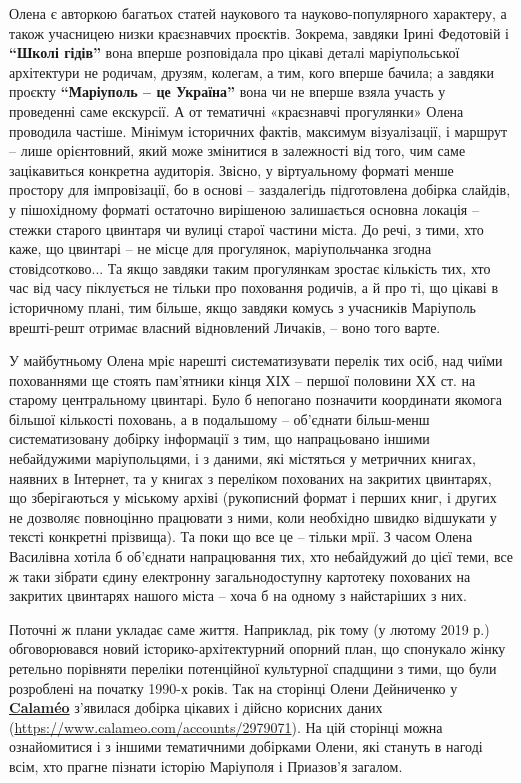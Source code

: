 
Олена є авторкою багатьох статей наукового та науково-популярного характеру, а
також учасницею низки краєзнавчих проєктів. Зокрема, завдяки Ірині Федотовій і
\textbf{\enquote{Школі гідів}} вона вперше розповідала про цікаві деталі маріупольської
архітектури не родичам, друзям, колегам, а тим, кого вперше бачила; а завдяки
проєкту \textbf{\enquote{Маріуполь – це Україна}} вона чи не вперше взяла участь у проведенні
саме екскурсії. А от тематичні «краєзнавчі прогулянки» Олена проводила частіше.
Мінімум історичних фактів, максимум візуалізації, і маршрут – лише орієнтовний,
який може змінитися в залежності від того, чим саме зацікавиться конкретна
аудиторія. Звісно, у віртуальному форматі менше простору для імпровізації, бо в
основі – заздалегідь підготовлена добірка слайдів, у пішохідному форматі
остаточно вирішеною залишається основна локація – стежки старого цвинтаря чи
вулиці старої частини міста. До речі, з тими, хто каже, що цвинтарі – не місце
для прогулянок, маріупольчанка згодна стовідсотково... Та якщо завдяки таким
прогулянкам зростає кількість тих, хто час від часу піклується не тільки про
поховання родичів, а й про ті, що цікаві в історичному плані, тим більше, якщо
завдяки комусь з учасників Маріуполь врешті-решт отримає власний відновлений
Личаків, – воно того варте.

У майбутньому Олена мріє нарешті систематизувати перелік тих осіб, над чиїми
похованнями ще стоять пам'ятники кінця ХІХ – першої половини ХХ ст. на старому
центральному цвинтарі. Було б непогано позначити координати якомога більшої
кількості поховань, а в подальшому – об'єднати більш-менш систематизовану
добірку інформації з тим, що напрацьовано іншими небайдужими маріупольцями, і з
даними, які містяться у метричних книгах, наявних в Інтернет, та у книгах з
переліком похованих на закритих цвинтарях, що зберігаються у міському архіві
(рукописний формат і перших книг, і других не дозволяє повноцінно працювати з
ними, коли необхідно швидко відшукати у тексті конкретні прізвища). Та поки що
все це – тільки мрії. З часом Олена Василівна хотіла б об'єднати напрацювання
тих, хто небайдужий до цієї теми, все ж таки зібрати єдину електронну
загальнодоступну картотеку похованих на закритих цвинтарях нашого міста – хоча
б на одному з найстаріших з них. 

Поточні ж плани укладає саме життя. Наприклад, рік тому (у лютому 2019 р.)
обговорювався новий історико-архітектурний опорний план, що спонукало жінку
ретельно порівняти переліки потенційної культурної спадщини з тими, що були
розроблені на початку 1990-х років. Так на сторінці Олени Дейниченко у \underline{\textbf{Calaméo}}
з'явилася добірка цікавих і дійсно корисних даних
(\url{https://www.calameo.com/accounts/2979071}). На цій сторінці можна
ознайомитися і з іншими тематичними добірками Олени, які стануть в нагоді всім,
хто прагне пізнати історію Маріуполя і Приазов'я загалом.

